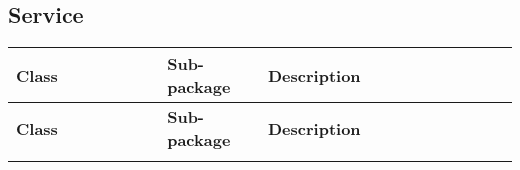 \subsection*{Service}
\renewcommand{\arraystretch}{1.5} %
\begin{longtable}{|>{\raggedright\arraybackslash}p{0.3\linewidth}|>{\raggedright\arraybackslash}p{0.2\linewidth}|>{\raggedright\arraybackslash}p{0.5\linewidth}|}
   
    \hline
    \textbf{Class} & \textbf{Sub-package} & \textbf{Description} \\
    \hline
    \endfirsthead

    \hline
    \textbf{Class} & \textbf{Sub-package} & \textbf{Description} \\
    \hline
    \endhead

    \hline
    \endfoot

    \hline
    \endlastfoot


\end{longtable}
